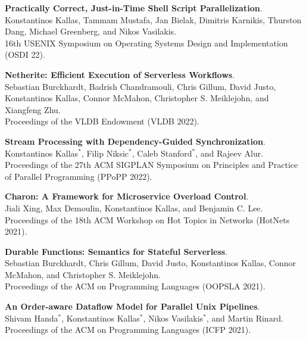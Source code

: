 \begin{minipage}{\textwidth}
\textbf{Practically Correct, Just-in-Time Shell Script Parallelization}. \\
Konstantinos Kallas, Tammam Mustafa, Jan Bielak, Dimitris Karnikis, Thurston Dang, Michael Greenberg, and Nikos Vasilakis. \\
16th USENIX Symposium on Operating Systems Design and Implementation (OSDI 22).
\end{minipage}

\begin{minipage}{\textwidth}
\textbf{Netherite: Efficient Execution of Serverless Workflows}. \\
Sebastian Burckhardt, Badrish Chandramouli, Chris Gillum, David Justo, Konstantinos Kallas, Connor McMahon, Christopher S. Meiklejohn, and Xiangfeng Zhu. \\
Proceedings of the VLDB Endowment (VLDB 2022).
\end{minipage}

\begin{minipage}{\textwidth}
\textbf{Stream Processing with Dependency-Guided Synchronization}. \\
Konstantinos Kallas$^*$, Filip Niksic$^*$, Caleb Stanford$^*$, and Rajeev Alur. \\
Proceedings of the 27th ACM SIGPLAN Symposium on Principles and Practice of Parallel Programming (PPoPP 2022).
\end{minipage}

\begin{minipage}{\textwidth}
\textbf{Charon: A Framework for Microservice Overload Control}. \\
Jiali Xing, Max Demoulin, Konstantinos Kallas, and Benjamin C. Lee. \\
Proceedings of the 18th ACM Workshop on Hot Topics in Networks (HotNets 2021).
\end{minipage}

\begin{minipage}{\textwidth}
\textbf{Durable Functions: Semantics for Stateful Serverless}. \\
Sebastian Burckhardt, Chris Gillum, David Justo, Konstantinos Kallas, Connor McMahon, and Christopher S. Meiklejohn. \\
Proceedings of the ACM on Programming Languages (OOPSLA 2021).
\end{minipage}

\begin{minipage}{\textwidth}
\textbf{An Order-aware Dataflow Model for Parallel Unix Pipelines}. \\
Shivam Handa$^*$, Konstantinos Kallas$^*$, Nikos Vasilakis$^*$, and Martin Rinard. \\
Proceedings of the ACM on Programming Languages (ICFP 2021).
\end{minipage}

